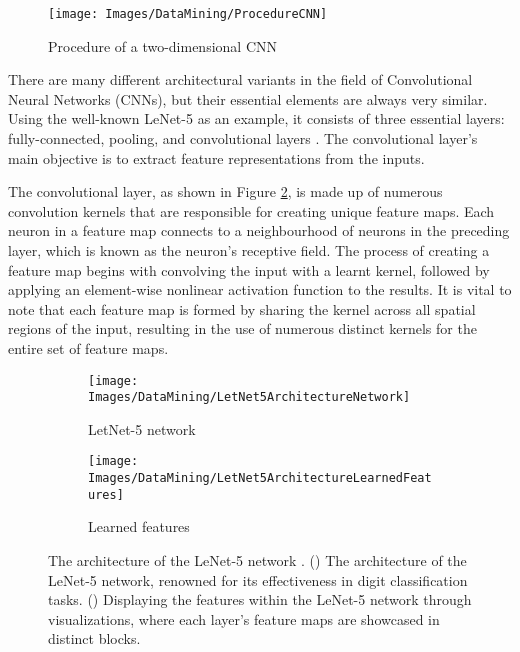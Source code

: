 \begin{figure}[h!]
	\centering
	\texttt{[image: Images/DataMining/ProcedureCNN]}
	\caption{Procedure of a two-dimensional CNN \cite{Win:2023}} \label{fig:ProcedureCNN}
\end{figure}

There are many different architectural variants in the field of Convolutional Neural Networks (CNNs), but their essential elements are always very similar. Using the well-known LeNet-5 as an example, it consists of three essential layers: fully-connected, pooling, and convolutional layers \cite{Gu:2018}. The convolutional layer's main objective is to extract feature representations from the inputs.

The convolutional layer, as shown in Figure \ref{subfig:LetNet5ArchitectureNetwork}, is made up of numerous convolution kernels that are responsible for creating unique feature maps. Each neuron in a feature map connects to a neighbourhood of neurons in the preceding layer, which is known as the neuron's receptive field. The process of creating a feature map begins with convolving the input with a learnt kernel, followed by applying an element-wise nonlinear activation function to the results. It is vital to note that each feature map is formed by sharing the kernel across all spatial regions of the input, resulting in the use of numerous distinct kernels for the entire set of feature maps.

\begin{figure}[h!]
	\centering
	
	\begin{subfigure}{0.65\textwidth}
		\texttt{[image: Images/DataMining/LetNet5ArchitectureNetwork]}
		\caption{LetNet-5 network}    %
		\label{subfig:LetNet5ArchitectureNetwork}
	\end{subfigure}
	\hfill
	\begin{subfigure}{0.3\textwidth}
		\texttt{[image: Images/DataMining/LetNet5ArchitectureLearnedFeatures]}
		\caption{Learned features}    %
		\label{subfig:LetNet5ArchitectureLearnedFeatures}
	\end{subfigure}
	
	\caption{The architecture of the LeNet-5 network \cite{Gu:2018}. () The architecture of the LeNet-5 network, renowned for its effectiveness in digit classification tasks. () Displaying the features within the LeNet-5 network through visualizations, where each layer's feature maps are showcased in distinct blocks.}
	\label{fig:LetNet5Architecture}
\end{figure}

